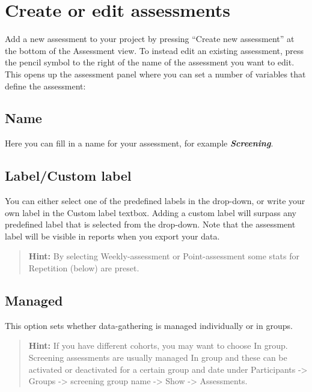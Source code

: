 \documentclass[
]{book}
\begin{document}
\section{Create or edit assessments}\label{create-or-edit-assessments}

Add a new assessment to your project by pressing ``Create new assessment'' at the bottom of the Assessment view. To instead edit an existing assessment, press the pencil symbol to the right of the name of the assessment you want to edit. This opens up the assessment panel where you can set a number of variables that define the assessment:

\subsection{Name}\label{name}

Here you can fill in a name for your assessment, for example \textbf{\emph{Screening}}.

\subsection{Label/Custom label}\label{labelcustom-label}

You can either select one of the predefined labels in the drop-down, or write your own label in the Custom label textbox. Adding a custom label will surpass any predefined label that is selected from the drop-down. Note that the assessment label will be visible in reports when you export your data.

\begin{quote}
\textbf{Hint:} By selecting Weekly-assessment or Point-assessment some stats for Repetition (below) are preset.
\end{quote}

\subsection{Managed}\label{managed}

This option sets whether data-gathering is managed individually or in groups.

\begin{quote}
\textbf{Hint:} If you have different cohorts, you may want to choose In group. Screening assessments are usually managed In group and these can be activated or deactivated for a certain group and date under Participants -\textgreater{} Groups -\textgreater{} screening group name -\textgreater{} Show -\textgreater{} Assessments.
\end{quote}
\end{document}
